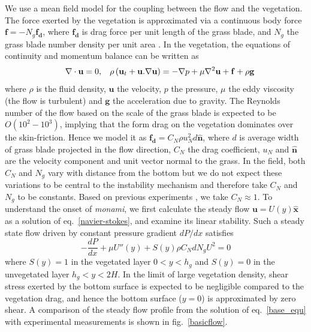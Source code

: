 \documentclass[aps,prl,twocolumn,superscriptaddress,10pt]{revtex4-1}  %
\newcommand{\bn}{{\boldsymbol{\hat{n}}}}
\newcommand{\bu}{\mathbf{u}}
\newcommand{\grad}{\mathbf{\nabla}}
\newcommand{\hg}{h_g}
\newcommand{\monami}{\textit{monami}}
\begin{document}
We use a mean field model for the coupling between the flow and the vegetation. 
The force exerted by the vegetation is approximated via a continuous body force $\mathbf{f}=-N_g\mathbf{f_d}$,  
where $\mathbf{f_{d}}$ is drag force per unit length of the grass blade, and $N_g$ the grass blade number density per unit area \cite{Vivoni98,Nepf99,Ghisal02,Delangre04,Delangre06}. 
In the vegetation, the equations of continuity and momentum balance can be written as 
\begin{equation}
\quad \grad\cdot\bu = 0,\hspace{3mm} \rho \left(\bu_{t}+\bu.\grad\bu \right) = -\grad p+\mu\grad^{2}\bu +\mathbf{f}+\rho\mathbf{g}
\label{navier-stokes}
\end{equation}
where $\rho$ is the fluid density, $\mathbf{u}$ the velocity, 
$p$ the pressure, $\mu$ the eddy viscosity (the flow is turbulent) and $\mathbf{g}$ the acceleration due to gravity. 
The Reynolds number of the flow based on the scale of the grass blade is expected to be $O(10^2-10^3)$, implying that the form drag on the vegetation dominates over the skin-friction. Hence we model it as 
$\mathbf{f_{d}}=C_N \rho u_{N}^{2}d\bn$, 
where $d$ is average width of grass blade projected in the flow direction, $C_{N}$ the drag coefficient, $u_{N}$ and $\bn$ are the velocity component and unit vector normal to the grass. 
In the field, both $C_N$ and $N_g$ vary with distance from the bottom but we do not expect these variations to be central to the instability mechanism and therefore take $C_N$ and $N_g$ to be constants. 
Based on previous experiments \cite{Vivoni98}, we take $C_N \approx 1$.
\newline
To understand the onset of \monami, we first calculate the steady flow $\bu = U(y)\boldsymbol{\hat{x}}$ as a solution of eq.~\eqref{navier-stokes}, and examine its linear stability. 
Such a steady state flow driven by constant pressure gradient $dP/dx$ satisfies 
\begin{equation}
 -\frac{dP}{dx}+\mu U''(y) +S(y) \rho C_N d N_gU^2=0
\label{base_equ}
\end{equation}
where $S(y)=1$ in the vegetated layer $0<y<\hg$ and $S(y)=0$ in the unvegetated layer $\hg< y< 2H$. 
In the limit of large vegetation density, shear stress exerted by the bottom surface is expected to be negligible compared to the vegetation drag, and hence the bottom surface ($y=0$) is approximated by zero shear.   
A comparison of the steady flow profile from the solution of eq.~\eqref{base_equ} with experimental measurements is shown in fig.~\ref{basicflow}.
\end{document}
